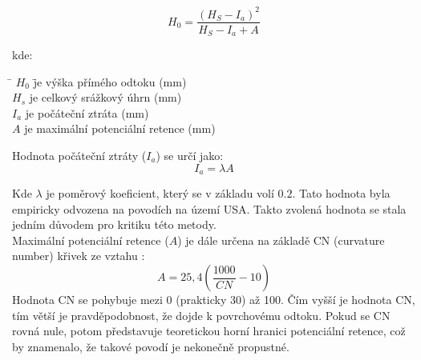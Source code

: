 \documentclass[a4paper,oneside,12pt]{book}
\begin{document}
\begin{equation}
H_{0} = \frac{\displaystyle (H_{S} - I_{a})^{2}}{\displaystyle H_{S} - I_{a} + A}
\end{equation}

kde:
\begin{tabbing}
    \hspace{10mm} \= $H_{0}$ \hspace{5mm} \= je výška přímého odtoku (mm) \\
    \> $H_{s}$ \> je celkový srážkový úhrn (mm) \\
    \> $I_{a}$ \> je počáteční ztráta (mm) \\
    \> $A$ \> je maximální potenciální retence (mm)
\end{tabbing}

Hodnota počáteční ztráty ($I_{a}$) se určí jako:
\begin{equation}
I_{a} = \lambda A
\end{equation}

\hspace{10mm} Kde $\lambda$ je poměrový koeficient, který se v základu volí $0.2$. Tato hodnota byla empiricky odvozena na povodích na území USA. \cite{Lian2020}\cite{MNYDGwleJOjKLRU2} Takto zvolená hodnota se stala jedním důvodem pro kritiku této metody. \cite{MNYDGwleJOjKLRUp} \\

\hspace{10mm} Maximální potenciální retence ($A$) je dále určena na základě CN (curvature number) křivek ze vztahu \cite{MNYDGwleJOjKdRUp} : 
\begin{equation}
A = 25,4 (\frac{1000}{CN}-10)
\end{equation}
\hspace{10mm} Hodnota CN se pohybuje mezi 0 (prakticky 30) až 100. Čím vyšší je hodnota CN, tím větší je pravděpodobnost, že dojde k povrchovému odtoku. Pokud se CN rovná nule, potom představuje teoretickou horní
hranici potenciální retence, což by znamenalo, že takové povodí je nekonečně propustné. \cite{MNYDGwleJOjKLRU3}
\end{document}
